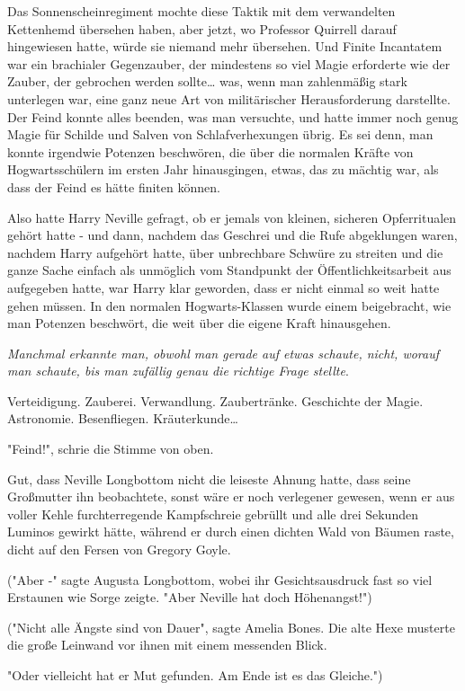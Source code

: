 {Das Sonnenscheinregiment mochte diese Taktik mit dem verwandelten Kettenhemd übersehen haben, aber jetzt, wo Professor Quirrell darauf hingewiesen hatte, würde sie niemand mehr übersehen. Und Finite Incantatem war ein brachialer Gegenzauber, der mindestens so viel Magie erforderte wie der Zauber, der gebrochen werden sollte… was, wenn man zahlenmäßig stark unterlegen war, eine ganz neue Art von militärischer Herausforderung darstellte. Der Feind konnte alles beenden, was man versuchte, und hatte immer noch genug Magie für Schilde und Salven von Schlafverhexungen übrig. Es sei denn, man konnte irgendwie Potenzen beschwören, die über die normalen Kräfte von Hogwartsschülern im ersten Jahr hinausgingen, etwas, das zu mächtig war, als dass der Feind es hätte finiten können.

Also hatte Harry Neville gefragt, ob er jemals von kleinen, sicheren Opferritualen gehört hatte - und dann, nachdem das Geschrei und die Rufe abgeklungen waren, nachdem Harry aufgehört hatte, über unbrechbare Schwüre zu streiten und die ganze Sache einfach als unmöglich vom Standpunkt der Öffentlichkeitsarbeit aus aufgegeben hatte, war Harry klar geworden, dass er nicht einmal so weit hatte gehen müssen. In den normalen Hogwarts-Klassen wurde einem beigebracht, wie man Potenzen beschwört, die weit über die eigene Kraft hinausgehen.

\emph{Manchmal erkannte man, obwohl man gerade auf etwas schaute, nicht, worauf man schaute, bis man zufällig genau die richtige Frage stellte}.

Verteidigung. Zauberei. Verwandlung. Zaubertränke. Geschichte der Magie. Astronomie. Besenfliegen. Kräuterkunde…

"Feind!", schrie die Stimme von oben.

Gut, dass Neville Longbottom nicht die leiseste Ahnung hatte, dass seine Großmutter ihn beobachtete, sonst wäre er noch verlegener gewesen, wenn er aus voller Kehle furchterregende Kampfschreie gebrüllt und alle drei Sekunden Luminos gewirkt hätte, während er durch einen dichten Wald von Bäumen raste, dicht auf den Fersen von Gregory Goyle.

("Aber -" sagte Augusta Longbottom, wobei ihr Gesichtsausdruck fast so viel Erstaunen wie Sorge zeigte. "Aber Neville hat doch Höhenangst!")

("Nicht alle Ängste sind von Dauer", sagte Amelia Bones. Die alte Hexe musterte die große Leinwand vor ihnen mit einem messenden Blick.

"Oder vielleicht hat er Mut gefunden. Am Ende ist es das Gleiche.")

}
